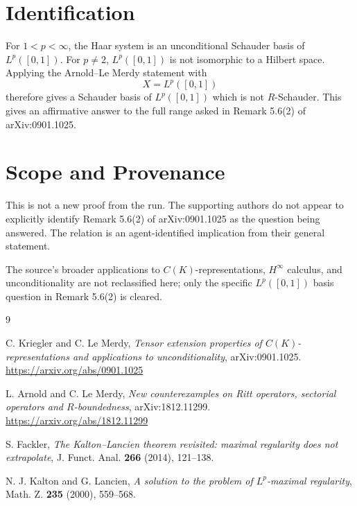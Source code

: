 \documentclass[11pt]{article}
\begin{document}
\section*{Identification}

For \(1<p<\infty\), the Haar system is an unconditional Schauder basis of
\(L^p([0,1])\). For \(p\neq2\), \(L^p([0,1])\) is not isomorphic to a Hilbert
space. Applying the Arnold--Le Merdy statement with
\[
  X=L^p([0,1])
\]
therefore gives a Schauder basis of \(L^p([0,1])\) which is not
\(R\)-Schauder. This gives an affirmative answer to the full range asked in
Remark 5.6(2) of arXiv:0901.1025.

\section*{Scope and Provenance}

This is not a new proof from the run. The supporting authors do not appear to
explicitly identify Remark 5.6(2) of arXiv:0901.1025 as the question being
answered. The relation is an agent-identified implication from their general
statement.

The source's broader applications to \(C(K)\)-representations, \(H^\infty\)
calculus, and unconditionality are not reclassified here; only the specific
\(L^p([0,1])\) basis question in Remark 5.6(2) is cleared.

\begin{thebibliography}{9}

C. Kriegler and C. Le Merdy,
\emph{Tensor extension properties of \(C(K)\)-representations and applications
to unconditionality},
arXiv:0901.1025.
\url{https://arxiv.org/abs/0901.1025}

L. Arnold and C. Le Merdy,
\emph{New counterexamples on Ritt operators, sectorial operators and
\(R\)-boundedness},
arXiv:1812.11299.
\url{https://arxiv.org/abs/1812.11299}

S. Fackler,
\emph{The Kalton--Lancien theorem revisited: maximal regularity does not
extrapolate},
J. Funct. Anal. \textbf{266} (2014), 121--138.

N. J. Kalton and G. Lancien,
\emph{A solution to the problem of \(L^p\)-maximal regularity},
Math. Z. \textbf{235} (2000), 559--568.

\end{thebibliography}
\end{document}
